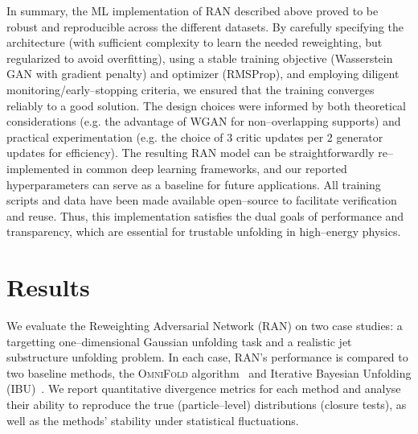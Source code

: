     In summary, the ML implementation of RAN described above proved to be robust and reproducible across the different datasets.
    By carefully specifying the architecture (with sufficient complexity to learn the needed reweighting, but regularized to avoid overfitting), using a stable training objective (Wasserstein GAN with gradient penalty) and optimizer (RMSProp), and employing diligent monitoring/early--stopping criteria, we ensured that the training converges reliably to a good solution.
    The design choices were informed by both theoretical considerations (e.g. the advantage of WGAN for non--overlapping supports) and practical experimentation (e.g. the choice of 3 critic updates per 2 generator updates for efficiency).
    The resulting RAN model can be straightforwardly re--implemented in common deep learning frameworks, and our reported hyperparameters can serve as a baseline for future applications.
    All training scripts and data have been made available open--source to facilitate verification and reuse.
    Thus, this implementation satisfies the dual goals of performance and transparency, which are essential for trustable unfolding in high--energy physics.

\section{Results}
    \label{sec:results}
    We evaluate the Reweighting Adversarial Network (RAN) on two case studies: a targetting one--dimensional Gaussian unfolding task and a realistic jet substructure unfolding problem.
    In each case, RAN’s performance is compared to two baseline methods, the \textsc{OmniFold} algorithm~ and Iterative Bayesian Unfolding (IBU)~.
    We report quantitative divergence metrics for each method and analyse their ability to reproduce the true (particle--level) distributions (closure tests), as well as the methods’ stability under statistical fluctuations.

